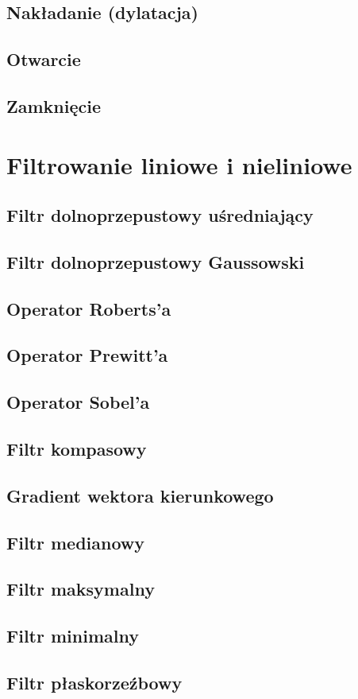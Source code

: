 \documentclass[a4paper,12pt]{book}
\begin{document}
\section{Nakładanie (dylatacja)}
\section{Otwarcie}
\section{Zamknięcie}

\chapter{Filtrowanie liniowe i nieliniowe}
\section{Filtr dolnoprzepustowy uśredniający}
\section{Filtr dolnoprzepustowy Gaussowski}
\section{Operator Roberts’a}
\section{Operator Prewitt’a}
\section{Operator Sobel’a}
\section{Filtr kompasowy}
\section{Gradient wektora kierunkowego}
\section{Filtr medianowy}
\section{Filtr maksymalny}
\section{Filtr minimalny}
\section{Filtr płaskorzeźbowy}
\end{document}
